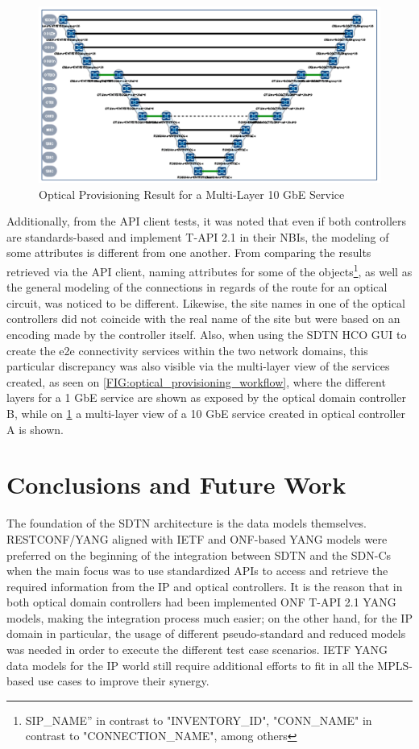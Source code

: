 \documentclass[a4paper,fleqn]{cas-dc}
\begin{document}
\begin{figure}
	\centering
		\includegraphics[width=\linewidth]{figs/optical_provisioning_result.png}
	\caption{Optical Provisioning Result for a Multi-Layer 10 GbE Service}
	\label{FIG:optical_provisioning_result}
\end{figure}

Additionally, from the API client tests, it was noted that even if both controllers are standards-based and implement T-API 2.1 in their NBIs, the modeling of some attributes is different from one another. From comparing the results retrieved via the API client, naming attributes for some of the objects\footnote{SIP\_NAME” in contrast to "INVENTORY\_ID", "CONN\_NAME" in contrast to "CONNECTION\_NAME", among others}, as well as the general modeling of the connections in regards of the route for an optical circuit, was noticed to be different. Likewise, the site names in one of the optical controllers did not coincide with the real name of the site but were based on an encoding made by the controller itself. Also, when using the SDTN HCO GUI to create the e2e connectivity services within the two network domains, this particular discrepancy was also visible via the multi-layer view of the services created, as seen on \cref{FIG:optical_provisioning_workflow}, where the different layers for a 1 GbE service are shown as exposed by the optical domain controller B, while on \cref{FIG:optical_provisioning_result} a multi-layer view of a 10 GbE service created in optical controller A is shown.


\section{Conclusions and Future Work}
\label{section:conclusions}
The foundation of the SDTN architecture is the data models themselves. RESTCONF/YANG aligned with IETF and ONF-based YANG models were preferred on the beginning of the integration between SDTN and the SDN-Cs  when the main focus was to use standardized APIs to access and retrieve the required information from the IP and optical controllers. It is the reason that in both optical domain controllers had been implemented ONF T-API 2.1 YANG models, making the integration process much easier; on the other hand, for the IP domain in particular, the usage of different pseudo-standard and reduced models was needed in order to execute the different test case scenarios. IETF YANG data models for the IP world still require additional efforts to fit in all the MPLS-based use cases to improve their synergy. 
\end{document}
